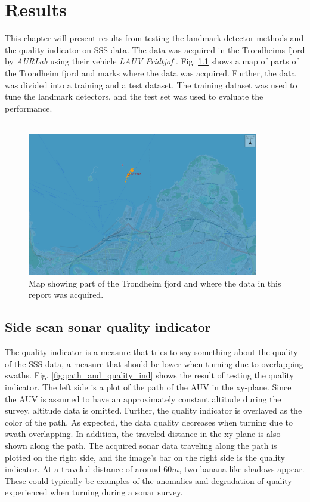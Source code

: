 \chapter{Results}

This chapter will present results from testing the landmark detector methods and the quality indicator on SSS data. The data was acquired in the Trondheims fjord by \textit{AURLab} using their vehicle \textit{LAUV Fridtjof} \cite{LAUVNTNU}. Fig. \ref{fig:neptus_screenshot} shows a map of parts of the Trondheim fjord and marks where the data was acquired. Further, the data was divided into a training and a test dataset. The training dataset was used to tune the landmark detectors, and the test set was used to evaluate the performance. 
\\
\\

\begin{figure} [h]%
  \centering
  \includegraphics[width=0.9\textwidth]{figures/neptus_screenshot.png}
  \caption{Map showing part of the Trondheim fjord and where the data in this report was acquired.}
  \label{fig:neptus_screenshot}
\end{figure}

\section{Side scan sonar quality indicator}

The quality indicator is a measure that tries to say something about the quality of the SSS data, a measure that should be lower when turning due to overlapping swaths. Fig. \ref{fig:path_and_quality_ind} shows the result of testing the quality indicator. The left side is a plot of the path of the AUV in the xy-plane. Since the AUV is assumed to have an approximately constant altitude during the survey, altitude data is omitted. Further, the quality indicator is overlayed as the color of the path. As expected, the data quality decreases when turning due to swath overlapping. In addition, the traveled distance in the xy-plane is also shown along the path. The acquired sonar data traveling along the path is plotted on the right side, and the image's bar on the right side is the quality indicator. At a traveled distance of around $60 m$, two banana-like shadows appear. These could typically be examples of the anomalies and degradation of quality experienced when turning during a sonar survey. 

